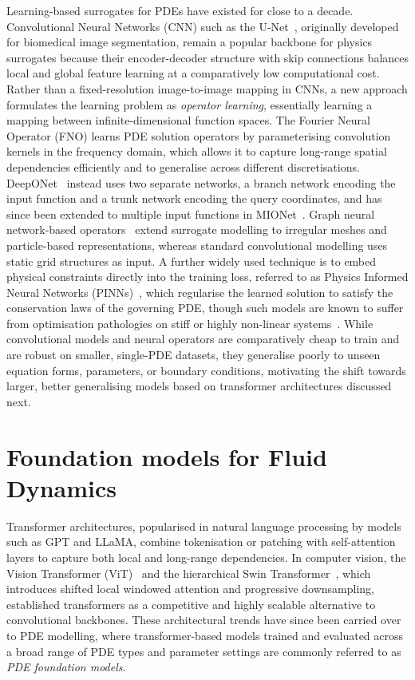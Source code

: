 Learning-based surrogates for PDEs have existed for close to a decade. Convolutional Neural Networks (CNN) such as the U-Net~\cite{ronneberger2015unet}, originally developed for biomedical image segmentation, remain a popular backbone for physics surrogates because their encoder-decoder structure with skip connections balances local and global feature learning at a comparatively low computational cost. Rather than a fixed-resolution image-to-image mapping in CNNs, a new approach formulates the learning problem as \textit{operator learning}, essentially learning a mapping between infinite-dimensional function spaces. The Fourier Neural Operator (FNO) \cite{li2021fno} learns PDE solution operators by parameterising convolution kernels in the frequency domain, which allows it to capture long-range spatial dependencies efficiently and to generalise across different discretisations. DeepONet~\cite{lu2021deeponet} instead uses two separate networks, a branch network encoding the input function and a trunk network encoding the query coordinates, and has since been extended to multiple input functions in MIONet~\cite{jin2022mionet}. Graph neural network-based operators~\cite{sanchezgonzalez2020learning, pfaff2021meshgraphnets} extend surrogate modelling to irregular meshes and particle-based representations, whereas standard convolutional modelling uses static grid structures as input. A further widely used technique is to embed physical constraints directly into the training loss, referred to as Physics Informed Neural Networks (PINNs)~\cite{raissi2019pinn}, which regularise the learned solution to satisfy the conservation laws of the governing PDE, though such models are known to suffer from optimisation pathologies on stiff or highly non-linear systems~\cite{krishnapriyan2021failuremodes}. While convolutional models and neural operators are comparatively cheap to train and are robust on smaller, single-PDE datasets, they generalise poorly to unseen equation forms, parameters, or boundary conditions, motivating the shift towards larger, better generalising models based on transformer architectures discussed next.

\section{Foundation models for Fluid Dynamics} 

Transformer architectures, popularised in natural language processing by models such as GPT and LLaMA, combine tokenisation or patching with self-attention layers to capture both local and long-range dependencies. In computer vision, the Vision Transformer (ViT)~\cite{dosovitskiy2020vit} and the hierarchical Swin Transformer~\cite{liu2021swin}, which introduces shifted local windowed attention and progressive downsampling, established transformers as a competitive and highly scalable alternative to convolutional backbones. These architectural trends have since been carried over to PDE modelling, where transformer-based models trained and evaluated across a broad range of PDE types and parameter settings are commonly referred to as \textit{PDE foundation models}. 

